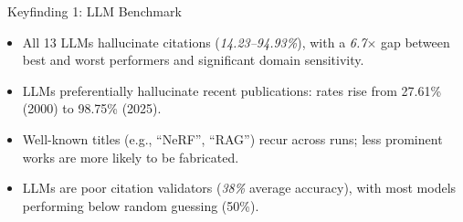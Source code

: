 \begin{keyfindingsSidebar}{\faLightbulb\ Keyfinding 1: LLM Benchmark}
\begin{itemize}
	\setlength{\itemsep}{0pt}
    \setlength{\topsep}{0pt}
    \setlength{\partopsep}{0pt}
    \setlength{\parsep}{0pt}
	\item All 13 LLMs hallucinate citations (\textit{14.23--94.93\%}), with a \textit{6.7$\times$} gap between best and worst performers and significant domain sensitivity.
	\item LLMs preferentially hallucinate recent publications: rates rise from 27.61\% (2000) to 98.75\% (2025).
	\item Well-known titles (e.g., ``NeRF'', ``RAG'') recur across runs; less prominent works are more likely to be fabricated.
	\item LLMs are poor citation validators (\textit{38\%} average accuracy), with most models performing below random guessing (50\%).
\end{itemize}
\end{keyfindingsSidebar}